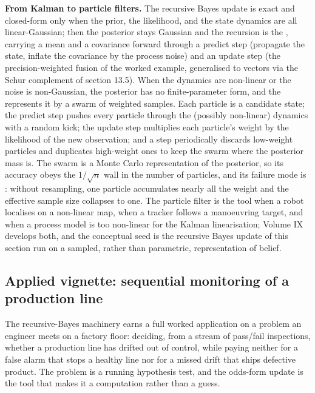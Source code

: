 \begin{mastery}
\textbf{From Kalman to particle filters.} The recursive Bayes update is
exact and closed-form only when the prior, the likelihood, and the
state dynamics are all linear-Gaussian; then the posterior stays
Gaussian and the recursion is the , carrying a
mean and a covariance forward through a predict step (propagate the
state, inflate the covariance by the process noise) and an update step
(the precision-weighted fusion of the worked example, generalised to
vectors via the Schur complement of section 13.5). When the dynamics are
non-linear or the noise is non-Gaussian, the posterior has no
finite-parameter form, and the  represents it
by a swarm of weighted samples. Each particle is a candidate state; the
predict step pushes every particle through the (possibly non-linear)
dynamics with a random kick; the update step multiplies each particle's
weight by the likelihood of the new observation; and a
 step periodically discards low-weight particles and
duplicates high-weight ones to keep the swarm where the posterior mass
is. The swarm is a Monte Carlo representation of the posterior, so its
accuracy obeys the $1/\sqrt{n}$ wall in the number of particles, and its
failure mode is : without resampling, one
particle accumulates nearly all the weight and the effective sample size
collapses to one. The particle filter is the tool when a robot localises
on a non-linear map, when a tracker follows a manoeuvring target, and
when a process model is too non-linear for the Kalman linearisation;
Volume IX develops both, and the conceptual seed is the recursive Bayes
update of this section run on a sampled, rather than parametric,
representation of belief.
\end{mastery}

\subsection{Applied vignette: sequential monitoring of a production
line}

The recursive-Bayes machinery earns a full worked application on a
problem an engineer meets on a factory floor: deciding, from a stream of
pass/fail inspections, whether a production line has drifted out of
control, while paying neither for a false alarm that stops a healthy line
nor for a missed drift that ships defective product. The problem is a
running hypothesis test, and the odds-form update is the tool that makes
it a computation rather than a guess.


